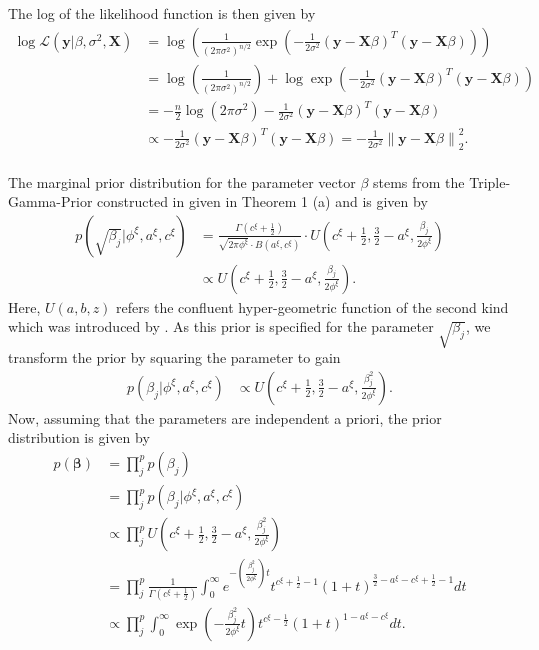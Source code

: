 \documentclass[12pt,a4paper]{article}
\newcommand{\norm}[1]{\left\lVert#1\right\rVert}
\begin{document}
The log of the likelihood function is then given by 
\begin{align*}
\log \mathcal{L}( \mathbf{y} |\beta, \sigma^2 , \mathbf{X}) &= \log \left( \frac{1}{(2\pi\sigma^2)^{n/2}} \exp\left(-\frac{1}{2\sigma^2} (\mathbf{y} - \mathbf{X}\beta)^T (\mathbf{y} - \mathbf{X}\beta)\right) \right) \\
&= \log \left( \frac{1}{(2\pi\sigma^2)^{n/2}} \right) + \log \exp\left(-\frac{1}{2\sigma^2} (\mathbf{y} - \mathbf{X}\beta)^T (\mathbf{y} - \mathbf{X}\beta)\right) \\
&= -\frac{n}{2} \log(2\pi\sigma^2) - \frac{1}{2\sigma^2} (\mathbf{y} - \mathbf{X}\beta)^T (\mathbf{y} - \mathbf{X}\beta)\\
&\propto - \frac{1}{2\sigma^2} (\mathbf{y} - \mathbf{X}\beta)^T (\mathbf{y} - \mathbf{X}\beta) = - \frac{1}{2\sigma^2}\norm{\mathbf{y} - \mathbf{X}\beta}_2^2.\\
\end{align*}

The marginal prior distribution for the parameter vector $\beta$ stems from the Triple-Gamma-Prior constructed in \textcite{TGP2020} given in Theorem 1 (a) and is given by
\begin{align*}
p(\sqrt{\beta_j}|\phi^\xi, a^\xi, c^\xi) &= \frac{\Gamma(c^\xi + \frac{1}{2})}{\sqrt{2\pi \phi^\xi}\cdot B(a^\xi, c^\xi)}\cdot U\left(c^\xi + \frac{1}{2}, \frac{3}{2}-a^\xi, \frac{\beta_j}{2\phi^\xi}\right)\\
&\propto U\left(c^\xi + \frac{1}{2}, \frac{3}{2}-a^\xi, \frac{\beta_j}{2\phi^\xi}\right).
\end{align*}
Here, $U(a,b,z)$ refers the confluent hyper-geometric function of the second kind which was introduced by \textcite{Tricomi1947}. As this prior is specified for the parameter $\sqrt{\beta_j}$, we transform the prior by squaring the parameter to gain
\begin{align*}
p(\beta_j|\phi^\xi, a^\xi, c^\xi) &\propto U\left(c^\xi + \frac{1}{2}, \frac{3}{2}-a^\xi, \frac{\beta_j^2}{2\phi^\xi}\right).
\end{align*}
Now, assuming that the parameters are independent a priori, the prior distribution is given by
\begin{align}
p(\mathbf{\beta}) 	&= \prod_j^p p(\beta_j) \nonumber\\
			&= \prod_j^p p(\beta_j|\phi^\xi, a^\xi, c^\xi) \nonumber\\
			&\propto \prod_j^p U\left(c^\xi + \frac{1}{2}, \frac{3}{2}-a^\xi, \frac{\beta_j^2}{2\phi^\xi}\right) \nonumber\\
			&= \prod_j^p \frac{1}{\Gamma(c^\xi + \frac{1}{2})}\int_0^\infty e^{-(\frac{\beta_j^2}{2\phi^\xi})t}t^{c^\xi + \frac{1}{2}-1}(1+t)^{\frac{3}{2}-a^\xi-c^\xi + \frac{1}{2}-1}dt \nonumber\\
			&\propto \prod_j^p \int_0^\infty \exp\left(-\frac{\beta_j^2}{2\phi^\xi}t\right)t^{c^\xi - \frac{1}{2}}(1+t)^{1-a^\xi-c^\xi} dt. \label{eq:prior}
\end{align}
\end{document}
